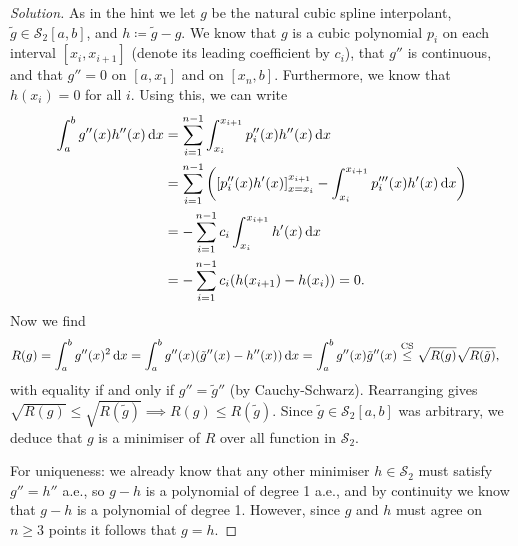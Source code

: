 \documentclass{article}
\theoremstyle{plain}
\theoremstyle{remark}
\newenvironment{solution}{\begin{proof}[Solution]\renewcommand\qedsymbol{}}{\end{proof}}
\newcommand{\Cal}{\mathcal}
\newcommand{\Rm}{\mathrm}
\renewcommand\SS{\Cal S}
\newcommand\ceq\coloneqq %
\begin{document}
\begin{solution}
As in the hint we let $g$ be the natural cubic spline interpolant, $\tilde g\in \SS_2[a, b]$, and $h \ceq \tilde g - g$. We know that $g$ is a cubic polynomial $p_i$ on each interval $[x_i, x_{i+1}]$ (denote its leading coefficient by $c_i$), that $g''$ is continuous, and that $g'' = 0$ on $[a, x_1]$ and on $[x_n, b]$. Furthermore, we know that $h(x_i) = 0$ for all $i$. 
Using this, we can write
\begin{align*}
	\int_a^b g''(x) h''(x) \dd{x} &= \sum_{i=1}^{n-1} \int_{x_i}^{x_{i+1}} p_i''(x) h''(x) \dd{x} \\
	&= \sum_{i=1}^{n-1} \qty(\qty[p_i''(x) h'(x)]_{x = x_i}^{ x_{i+1}} - \int_{x_i}^{x_{i+1}} p_i'''(x) h'(x) \dd{x}) \\
	&= - \sum_{i=1}^{n-1} c_i \int_{x_i}^{x_{i+1}} h'(x) \dd{x} \\
	&= - \sum_{i=1}^{n-1} c_i \qty(h(x_{i+1}) - h(x_i)) = 0. 
\end{align*} 
Now we find
\begin{align*}
	R(g) &= \int_a^b g''(x)^2 \dd{x} = \int_a^b g''(x) \qty(\tilde g''(x) - h''(x)) \dd{x} = \int_a^b g''(x) \tilde g''(x) \overset{\Rm{CS}}{\leq} \sqrt{R(g)} \sqrt{R(\tilde g)},
\end{align*}
with equality if and only if $g'' = \tilde g''$ (by Cauchy-Schwarz).
Rearranging gives $\sqrt{R(g)} \leq \sqrt{R(\tilde g)} \implies R(g) \leq R(\tilde g)$. Since $\tilde g \in \SS_2[a, b]$ was arbitrary, we deduce that $g$ is a minimiser of $R$ over all function in $\SS_2$. 

For uniqueness: we already know that any other minimiser $h \in \SS_2$ must satisfy $g'' = h''$ a.e., so $g - h$ is a polynomial of degree 1 a.e., and by continuity we know that $g - h$ is a polynomial of degree 1. However, since $g$ and $h$ must agree on $n \geq 3$ points it follows that $g = h$. 
\end{solution}
\end{document}
